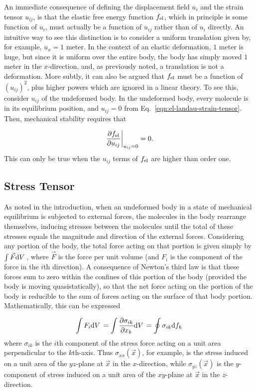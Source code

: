 An immediate consequence of defining the displacement field $u_i$ and the strain tensor $u_{ij}$, is that the elastic free energy function $f_{\text{el}}$, which in principle is some function of $u_i$, must actually be a function of $u_{ij}$ rather than of $u_i$ directly.  An intuitive way to see this distinction is to consider a uniform translation given by, for example, $u_x = 1$ meter.  In the context of an elastic deformation, $1$ meter is huge, but since it is uniform over the entire body, the body has simply moved $1$ meter in the $x$-direction, and, as previously noted, a translation is not a deformation.  More subtly, it can also be argued that $f_{\text{el}}$ must be a function of $(u_{ij})^2$, plus higher powers which are ignored in a linear theory.  To see this, consider $u_{ij}$ of the undeformed body.  In the undeformed body, every molecule is in its equilibrium position, and  $u_{ij} = 0$ from Eq.~\ref{eqn:el-landau-strain-tensor}.  Then, mechanical stability requires that

\begin{equation}\label{eqn:el-landau-mechanical-stability}
\left. \frac{\partial f_{\text{el}}}{\partial u_{ij}} \right|_{u_{ij} = 0} = 0.
\end{equation}
%
This can only be true when the $u_{ij}$ terms of $f_{\text{el}}$ are higher than order one.

\subsection{Stress Tensor}

As noted in the introduction, when an undeformed body in a state of mechanical equilibrium is subjected to external forces, the molecules in the body rearrange themselves, inducing stresses between the molecules until the total of these stresses equals the magnitude and direction of the external forces.  Considering any portion of the body, the total force acting on that portion is given simply by $\int \vec{F} {\text{d}V}\,$, where $\vec{F}$ is the force per unit volume (and $F_i$ is the component of the force in the $i$th direction).  A consequence of Newton's third law is that these forces sum to zero within the confines of this portion of the body (provided the body is moving quasistatically), so that the net force acting on the portion of the body is reducible to the sum of forces acting on the surface of that body portion.  Mathematically, this can be expressed

\begin{equation}
\int F_i {\text{d}V}\, = \int \frac{\partial \sigma_{ik}}{\partial x_k} {\text{d}V}\, = \oint \sigma_{ik} {\text{d}f_k}\,
\end{equation}
%
where $\sigma_{ik}$ is the $i$th component of the stress force acting on a unit area perpendicular to the $k$th-axis.  Thus $\sigma_{xx}(\vec{x})$, for example, is the stress induced on a unit area of the $yz$-plane at $\vec{x}$ in the $x$-direction, while $\sigma_{yz}(\vec{x})$ is the $y$-component of stress induced on a unit area of the $xy$-plane at $\vec{x}$ in the $z$-direction.

